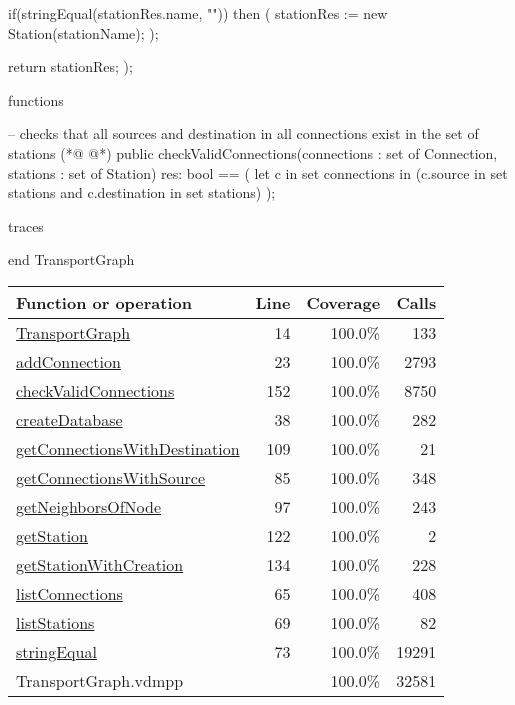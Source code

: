 \begin{vdmpp}[breaklines=true]
  if(stringEqual(stationRes.name, "")) then (
   stationRes := new Station(stationName);
  );
  
  return stationRes;
 );
 
functions

 -- checks that all sources and destination in all connections exist in the set of stations
(*@
\label{checkValidConnections:152}
@*)
 public checkValidConnections(connections : set of Connection, stations : set of Station) res: bool ==
 (
  let c in set connections
  in (c.source in set stations and c.destination in set stations)
 );

traces

end TransportGraph
\end{vdmpp}
\bigskip
\begin{longtable}{|l|r|r|r|}
\hline
Function or operation & Line & Coverage & Calls \\
\hline
\hline
\hyperref[TransportGraph:14]{TransportGraph} & 14&100.0\% & 133 \\
\hline
\hyperref[addConnection:23]{addConnection} & 23&100.0\% & 2793 \\
\hline
\hyperref[checkValidConnections:152]{checkValidConnections} & 152&100.0\% & 8750 \\
\hline
\hyperref[createDatabase:38]{createDatabase} & 38&100.0\% & 282 \\
\hline
\hyperref[getConnectionsWithDestination:109]{getConnectionsWithDestination} & 109&100.0\% & 21 \\
\hline
\hyperref[getConnectionsWithSource:85]{getConnectionsWithSource} & 85&100.0\% & 348 \\
\hline
\hyperref[getNeighborsOfNode:97]{getNeighborsOfNode} & 97&100.0\% & 243 \\
\hline
\hyperref[getStation:122]{getStation} & 122&100.0\% & 2 \\
\hline
\hyperref[getStationWithCreation:134]{getStationWithCreation} & 134&100.0\% & 228 \\
\hline
\hyperref[listConnections:65]{listConnections} & 65&100.0\% & 408 \\
\hline
\hyperref[listStations:69]{listStations} & 69&100.0\% & 82 \\
\hline
\hyperref[stringEqual:73]{stringEqual} & 73&100.0\% & 19291 \\
\hline
\hline
TransportGraph.vdmpp & & 100.0\% & 32581 \\
\hline
\end{longtable}

